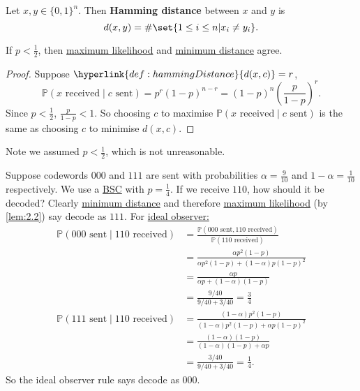 \documentclass{article}
\newcommand{\Prob}{\mathbb{P}}
\newcommand{\1}[1]{\mathbbm{1}_{#1}}
\begin{document}
\begin{defi}\label{def:hammingDistance}
    Let $x, y \in \{0, 1\}^n$. Then \textbf{Hamming distance} between $x$ and $y$ is
    \begin{equation*}d(x, y) = \# \set{1 \leq i \leq n | x_i \neq y_i}.\end{equation*}
\end{defi}
\begin{nlemma}\label{lem:2.2}
    If $p < \frac{1}{2}$, then \hyperlink{def:maximumLikelihood}{maximum likelihood} and \hyperlink{def:minimumDistanceRule}{minimum distance} agree.
\end{nlemma}
\begin{proof}
    Suppose $\hyperlink{def:hammingDistance}{d(x, c)} = r$,
    \begin{equation*}
        \Prob(x \text{ received} \mid c \text{ sent}) = p^r (1-p)^{n-r} = (1-p)^n \left(\frac{p}{1-p}\right)^r.
    \end{equation*}
    Since $p < \frac{1}{2}$, $\frac{p}{1-p} < 1$. So choosing $c$ to maximise $\Prob(x \text{ received} \mid c \text{ sent})$ is the same as choosing $c$ to minimise $d(x, c)$.
\end{proof}
Note we assumed $p < \frac{1}{2}$, which is not unreasonable.
\begin{eg}
    Suppose codewords $000$ and $111$ are sent with probabilities $\alpha = \frac{9}{10}$ and $1-\alpha = \frac{1}{10}$ respectively. We use a \hyperlink{def:bsc}{BSC} with $p = \frac{1}{4}$.
    If we receive $110$, how should it be decoded?
    Clearly \hyperlink{def:minimumDistanceRule}{minimum distance} and therefore \hyperlink{def:maximumLikelihood}{maximum likelihood} (by \cref{lem:2.2}) say decode as $111$.
    For \hyperlink{def:idealObserver}{ideal observer:}
    \begin{align*}
        \Prob(000 \text{ sent} \mid 110 \text{ received}) &= \frac{\Prob(000 \text{ sent} , 110 \text{ received})}{\Prob(110 \text{ received})} \\
                                                   &= \frac{\alpha p^2 (1-p)}{\alpha p^2 (1-p) + (1-\alpha) p (1-p)^2} \\
                                                   &= \frac{\alpha p}{\alpha p + (1-\alpha) (1-p)} \\
                                                   &= \frac{9/40}{9/40 + 3/40} = \frac{3}{4} \\
        \Prob(111 \text{ sent} \mid 110 \text{ received}) &= \frac{(1-\alpha) p^2 (1-p)}{(1-\alpha) p^2 (1-p) + \alpha p (1-p)^2} \\
                                                   &= \frac{(1-\alpha)(1-p)}{(1-\alpha)(1-p) + \alpha p} \\
                                                   &= \frac{3/40}{9/40 + 3/40} = \frac{1}{4}.
    \end{align*}
    So the ideal observer rule says decode as $000$.
\end{eg}
\end{document}
